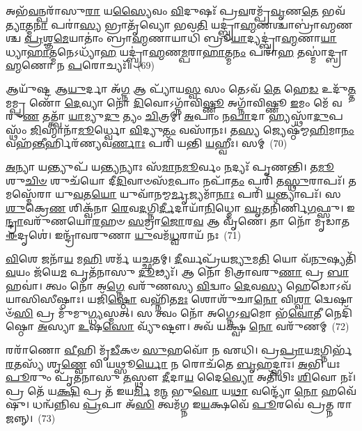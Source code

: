 𑌅𑌭᳴\-\ul{𑌵}\-𑌨𑍍𑌪𑌰𑌾᳴𑌸𑍁\-\ul{𑌰𑌾} 𑌯\-\ul{𑌸𑍍𑌯𑍈}\-𑌵𑌂 \ul{𑌵𑌿}\-𑌦𑍁𑌷𑌃᳴ 𑌪𑍍𑌰\-\ul{𑌵}\-𑌰𑌮𑍍𑌪𑍍𑌰᳴\-\ul{𑌵𑍃}\-𑌣\-\ul{𑌤𑍇} 𑌭𑌵᳴\-\ul{𑌤𑍍𑌯𑌾}\-𑌤𑍍𑌮\-\ul{𑌨𑌾} 𑌪𑌰𑌾॑\-\ul{𑌸𑍍𑌯} 𑌭𑍍𑌰𑌾𑌤𑍃᳴𑌵𑍍𑌯𑍋 𑌭𑌵\-\ul{𑌤𑌿} 𑌯𑌦𑍍𑌬𑍍𑌰𑌾॑\-\ul{𑌹𑍍𑌮}\-𑌣𑌶𑍍𑌚𑌾𑌬𑍍𑌰𑌾॑𑌹𑍍𑌮𑌣𑌶𑍍𑌚 \ul{𑌪𑍍𑌰}\-𑌶𑍍𑌞\-\ul{𑌮𑍇}\-𑌯𑌾𑌤𑌾𑌂॑ 𑌬𑍍𑌰𑌾\-\ul{𑌹𑍍𑌮}\-𑌣𑌾𑌯𑌾𑌧𑌿᳴ 𑌬𑍍𑌰𑍂\-\ul{𑌯𑌾}\-𑌦𑍍𑌯𑌦𑍍𑌬𑍍𑌰𑌾॑\-\ul{𑌹𑍍𑌮}\-𑌣𑌾\-\ul{𑌯𑌾}\-𑌧𑍍𑌯𑌾\-\ul{𑌹𑌾}\-𑌤𑍍𑌮𑌨𑍇\-𑌽𑌧𑍍𑌯𑌾᳴\-\ul{𑌹} 𑌯𑌦𑍍𑌬𑍍𑌰𑌾॑\-\ul{𑌹𑍍𑌮}\-𑌣\-\ul{𑌮𑍍𑌪}\-𑌰𑌾\-\ul{𑌹𑌾}\-𑌤𑍍𑌮\-\ul{𑌨𑌂} 𑌪𑌰𑌾᳴\-\ul{𑌹} 𑌤𑌸𑍍𑌮𑌾॑𑌦𑍍𑌬𑍍𑌰𑌾\-\ul{𑌹𑍍𑌮}\-𑌣𑍋 𑌨 \ul{𑌪}\-𑌰𑍋𑌚𑍍𑌯𑌃᳴॥~(69)

{\anuvakamend[{𑌵𑌾 𑌆᳴\-\ul{𑌰}\-𑌣𑍍𑌯𑌾𑍟𑌶𑍍𑌚𑌾𑌵᳴ \ul{𑌰𑍁}\-𑌨𑍍𑌧𑍇\-𑌽𑌥𑍋᳴ \ul{𑌪}\-𑌶𑍁\-\ul{𑌭𑌿𑌃} 𑌸𑍋॑\-𑌽𑌬𑍍𑌰𑌵𑍀𑌦𑍍𑌦𑌕𑍍𑌷𑌿\-\ul{𑌣𑌾}\-𑌰𑍍𑌧𑍍𑌯᳴𑌨𑍍𑌤𑍍𑌰𑌯᳴ 𑌇𑌵 \ul{𑌧𑍍𑌰𑍁}\-𑌵𑌾 \ul{𑌦𑍇}\-𑌵𑌾𑌶𑍍𑌚᳴𑌤𑍍𑌵𑌾\-\ul{𑌰𑌿}\-\-\ul{𑍞}\-𑌶𑌚𑍍𑌚᳴}]}%

𑌆𑌯𑍁᳴𑌷𑍍𑌟 𑌆\-\ul{𑌯𑍁}\-𑌰𑍍𑌦𑌾 𑌅᳴\-\ul{𑌗𑍍𑌨} 𑌆 𑌪𑍍𑌯𑌾᳴𑌯\-\ul{𑌸𑍍𑌵} 𑌸𑌂 𑌤𑍇\-𑌽𑌵᳴ \ul{𑌤𑍇} 𑌹𑍇\-\ul{𑌡} 𑌉𑌦𑍁᳴\-\ul{𑌤𑍍𑌤}\-𑌮𑌮𑍍𑌪𑍍𑌰 𑌣𑍋᳴ \ul{𑌦𑍇}\-𑌵𑍍𑌯𑌾 𑌨𑍋᳴ \ul{𑌦𑌿}\-𑌵𑍋\-𑌽𑌗𑍍𑌨𑌾᳴𑌵𑌿\-\ul{𑌷𑍍𑌣𑍂} 𑌅𑌗𑍍𑌨𑌾᳴𑌵𑌿𑌷𑍍𑌣𑍂 \ul{𑌇}\-𑌮𑌂 𑌮𑍇᳴ 𑌵𑌰𑍁\-\ul{𑌣} 𑌤𑌤𑍍𑌤𑍍𑌵𑌾᳴ \ul{𑌯𑌾}\-𑌮𑍍𑌯𑍁\-\ul{𑌦𑍁} 𑌤𑍍𑌯𑌂 \ul{𑌚𑌿}\-𑌤𑍍𑌰𑌮𑍍। \ul{𑌅}\-𑌪𑌾𑌂 𑌨\-\ul{𑌪𑌾}\-𑌦𑌾 𑌹𑍍𑌯𑌸𑍍𑌥𑌾᳴\-\ul{𑌦𑍁}\-𑌪𑌸𑍍𑌥𑌂᳴ \ul{𑌜𑌿}\-𑌹𑍍𑌮𑌾𑌨𑌾᳴\-\ul{𑌮𑍂}\-𑌰𑍍𑌧𑍍𑌵𑍋 \ul{𑌵𑌿}\-𑌦𑍍𑌯𑍁\-\ul{𑌤𑌂} 𑌵𑌸𑌾᳴𑌨𑌃। 𑌤\-\ul{𑌸𑍍𑌯} 𑌜𑍍𑌯𑍇𑌷𑍍𑌠᳴𑌮𑍍𑌮\-\ul{𑌹𑌿}\-𑌮𑌾\-\ul{𑌨𑌂} 𑌵𑌹᳴\-\ul{𑌨𑍍𑌤𑍀}\-𑌰𑍍\mbox{}𑌹𑌿𑌰᳴𑌣𑍍𑌯𑌵\-\ul{𑌰𑍍𑌣𑌾𑌃} 𑌪𑌰𑌿᳴ 𑌯𑌨𑍍𑌤𑌿 \ul{𑌯}\-𑌹𑍍𑌵𑍀𑌃। 𑌸𑌮𑍍~(70)

\-\ul{𑌅}\-𑌨𑍍𑌯𑌾 𑌯𑌨𑍍𑌤𑍍𑌯𑍁𑌪᳴ 𑌯\-\ul{𑌨𑍍𑌤𑍍𑌯}\-𑌨𑍍𑌯𑌾𑌃 𑌸᳴\-\ul{𑌮𑌾}\-𑌨\-\ul{𑌮𑍂}\-𑌰𑍍𑌵𑌂 \ul{𑌨}\-𑌦𑍍𑌯𑌃᳴ 𑌪𑍃𑌣𑌨𑍍𑌤𑌿। 𑌤\-\ul{𑌮𑍂} 𑌶𑍁\-\ul{𑌚𑌿}\-\-\ul{𑍞} 𑌶𑍁𑌚᳴𑌯𑍋 𑌦𑍀\-\ul{𑌦𑌿}\-𑌵𑌾𑍞𑌸᳴\-\ul{𑌮}\-𑌪𑌾𑌂 𑌨𑌪𑌾᳴\-\ul{𑌤𑌂} 𑌪𑌰𑌿᳴ 𑌤\-\ul{𑌸𑍍𑌥𑍁}\-𑌰𑌾𑌪𑌃᳴। 𑌤𑌮𑌸𑍍𑌮𑍇᳴𑌰𑌾 𑌯𑍁\-\ul{𑌵}\-𑌤\-\ul{𑌯𑍋} 𑌯𑍁𑌵𑌾᳴𑌨𑌮𑍍𑌮\-\ul{𑌰𑍍𑌮𑍃}\-𑌜𑍍𑌯𑌮𑌾᳴\-\ul{𑌨𑌾𑌃} 𑌪𑌰𑌿᳴ \ul{𑌯}\-𑌨𑍍𑌤𑍍𑌯𑌾𑌪𑌃᳴। 𑌸 \ul{𑌶𑍁}\-𑌕𑍍𑌰𑍇\-\ul{𑌣} 𑌶𑌿𑌕𑍍𑌵᳴𑌨𑌾 \ul{𑌰𑍇}\-𑌵\-\ul{𑌦}\-𑌗𑍍𑌨𑌿\-\ul{𑌰𑍍𑌦𑍀}\-𑌦𑌾𑌯𑌾᳴\-\ul{𑌨𑌿}\-𑌧𑍍𑌮𑍋 \ul{𑌘𑍃}\-𑌤𑌨𑌿᳴𑌰𑍍𑌣𑌿\-\ul{𑌗}\-𑌫𑍍𑌸𑍁। 𑌇\-\ul{𑌨𑍍𑌦𑍍𑌰𑌾}\-𑌵𑌰𑍁᳴𑌣𑌯𑍋\-\ul{𑌰}\-𑌹𑍞 \ul{𑌸}\-𑌮𑍍𑌰𑌾\-\ul{𑌜𑍋}\-𑌰\-\ul{𑌵} 𑌆 𑌵𑍃᳴𑌣𑍇। 𑌤𑌾 𑌨𑍋᳴ 𑌮𑍃𑌡𑌾𑌤 \ul{𑌈}\-𑌦𑍃𑌶𑍇॑। 𑌇𑌨𑍍𑌦𑍍𑌰𑌾᳴𑌵𑌰𑍁𑌣𑌾 \ul{𑌯𑍁}\-𑌵𑌮᳴\-\ul{𑌧𑍍𑌵}\-𑌰𑌾𑌯᳴ 𑌨𑌃~(71)

\-\ul{𑌵𑌿}\-𑌶𑍇 𑌜𑌨𑌾᳴\-\ul{𑌯} 𑌮\-\ul{𑌹𑌿} 𑌶𑌰𑍍𑌮᳴ 𑌯𑌚𑍍𑌛𑌤𑌮𑍍। \ul{𑌦𑍀}\-𑌰𑍍𑌘𑌪𑍍𑌰᳴𑌯\-\ul{𑌜𑍍𑌯𑍁}\-𑌮\-\ul{𑌤𑌿} 𑌯𑍋 𑌵᳴\-\ul{𑌨𑍁}\-𑌷𑍍𑌯𑌤𑌿᳴ \ul{𑌵}\-𑌯𑌂 𑌜᳴𑌯𑍇\-\ul{𑌮} 𑌪𑍃𑌤᳴𑌨𑌾𑌸𑍁 \ul{𑌦𑍂}\-𑌢𑍍𑌯𑌃᳴। 𑌆 𑌨𑍋᳴ 𑌮𑌿𑌤𑍍𑌰𑌾𑌵𑌰𑍁\-\ul{𑌣𑌾} 𑌪𑍍𑌰 \ul{𑌬𑌾}\-𑌹𑌵𑌾॑। 𑌤𑍍𑌵𑌂 𑌨𑍋᳴ 𑌅\-\ul{𑌗𑍍𑌨𑍇} 𑌵𑌰𑍁᳴𑌣𑌸𑍍𑌯 \ul{𑌵𑌿}\-𑌦𑍍𑌵𑌾𑌂 \ul{𑌦𑍇}\-𑌵\-\ul{𑌸𑍍𑌯} 𑌹𑍇𑌡𑍋\-𑌽𑌵᳴ 𑌯𑌾𑌸𑌿𑌸𑍀𑌷𑍍𑌠𑌾𑌃। 𑌯𑌜𑌿᳴\-\ul{𑌷𑍍𑌠𑍋} 𑌵𑌹𑍍𑌨𑌿᳴𑌤\-\ul{𑌮𑌃} 𑌶𑍋𑌶𑍁᳴𑌚𑌾\-\ul{𑌨𑍋} 𑌵𑌿\-\ul{𑌶𑍍𑌵𑌾} 𑌦𑍍𑌵𑍇𑌷𑌾𑍞᳴\-\ul{𑌸𑌿} 𑌪𑍍𑌰 𑌮𑍁᳴𑌮𑍁\-\ul{𑌗𑍍𑌧𑍍𑌯}\-𑌸𑍍𑌮𑌤𑍍। 𑌸 𑌤𑍍𑌵𑌂 𑌨𑍋᳴ 𑌅𑌗𑍍𑌨𑍇\-𑌽\-\ul{𑌵}\-𑌮𑍋 𑌭᳴\-\ul{𑌵𑍋}\-𑌤𑍀 𑌨𑍇𑌦𑌿᳴𑌷𑍍𑌠𑍋 \ul{𑌅}\-𑌸𑍍𑌯𑌾 \ul{𑌉}\-𑌷\-\ul{𑌸𑍋} 𑌵𑍍𑌯𑍁᳴𑌷𑍍𑌟𑍗। 𑌅𑌵᳴ 𑌯𑌕𑍍𑌷𑍍𑌵 \ul{𑌨𑍋} 𑌵𑌰𑍁᳴𑌣𑌮𑍍~(72)

𑌰𑌰𑌾᳴𑌣𑍋 \ul{𑌵𑍀}\-𑌹𑌿 𑌮𑍃᳴\-\ul{𑌡𑍀}\-𑌕𑍞 \ul{𑌸𑍁}\-𑌹𑌵𑍋᳴ 𑌨 𑌏𑌧𑌿। 𑌪𑍍𑌰\-\ul{𑌪𑍍𑌰𑌾}\-𑌯\-\ul{𑌮}\-𑌗𑍍𑌨𑌿𑌰𑍍𑌭᳴\-\ul{𑌰}\-𑌤𑌸𑍍𑌯᳴ 𑌶𑍃\-\ul{𑌣𑍍𑌵𑍇} 𑌵𑌿 𑌯𑌥𑍍𑌸𑍂\-\ul{𑌰𑍍𑌯𑍋} 𑌨 𑌰𑍋𑌚᳴𑌤𑍇 \ul{𑌬𑍃}\-𑌹𑌦𑍍𑌭𑌾𑌃। \ul{𑌅}\-𑌭𑌿 𑌯𑌃 \ul{𑌪𑍂}\-𑌰𑍁𑌂 𑌪𑍃᳴𑌤𑌨𑌾𑌸𑍁 \ul{𑌤}\-𑌸𑍍𑌥𑍗 \ul{𑌦𑍀}\-𑌦𑌾\-\ul{𑌯} 𑌦𑍈\-\ul{𑌵𑍍𑌯𑍋} 𑌅𑌤𑌿᳴𑌥𑌿𑌃 \ul{𑌶𑌿}\-𑌵𑍋 𑌨𑌃᳴। 𑌪𑍍𑌰 𑌤𑍇᳴ 𑌯\-\ul{𑌕𑍍𑌷𑌿} 𑌪𑍍𑌰 𑌤᳴ 𑌇𑌯\-\ul{𑌰𑍍𑌮𑌿} 𑌮\-\ul{𑌨𑍍𑌮} 𑌭𑍁\-\ul{𑌵𑍋} 𑌯\-\ul{𑌥𑌾} 𑌵𑌨𑍍𑌦𑍍𑌯𑍋᳴ \ul{𑌨𑍋} 𑌹𑌵𑍇᳴𑌷𑍁। 𑌧𑌨𑍍𑌵᳴𑌨𑍍𑌨𑌿𑌵 \ul{𑌪𑍍𑌰}\-𑌪𑌾 𑌅᳴\-\ul{𑌸𑌿} 𑌤𑍍𑌵𑌮᳴𑌗𑍍𑌨 𑌇\-\ul{𑌯}\-𑌕𑍍𑌷𑌵𑍇᳴ \ul{𑌪𑍂}\-𑌰𑌵𑍇॑ 𑌪𑍍𑌰𑌤𑍍𑌨 𑌰𑌾𑌜𑌨𑍍𑌨𑍍।~(73)

